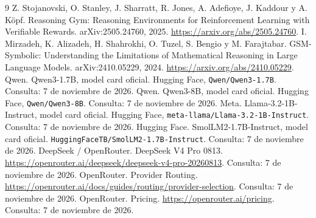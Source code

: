 \begingroup\raggedright
\begin{thebibliography}{9}
 Z. Stojanovski, O. Stanley, J. Sharratt, R. Jones,
A. Adefioye, J. Kaddour y A. K\"opf. Reasoning Gym: Reasoning Environments
for Reinforcement Learning with Verifiable Rewards. arXiv:2505.24760, 2025.
\url{https://arxiv.org/abs/2505.24760}.
 I. Mirzadeh, K. Alizadeh, H. Shahrokhi, O. Tuzel,
S. Bengio y M. Farajtabar. GSM-Symbolic: Understanding the Limitations
of Mathematical Reasoning in Large Language Models. arXiv:2410.05229, 2024.
\url{https://arxiv.org/abs/2410.05229}.
 Qwen. Qwen3-1.7B, model card oficial. Hugging Face,
\texttt{Qwen/Qwen3-1.7B}. Consulta: 7 de noviembre de 2026.
 Qwen. Qwen3-8B, model card oficial. Hugging Face,
\texttt{Qwen/Qwen3-8B}. Consulta: 7 de noviembre de 2026.
 Meta. Llama-3.2-1B-Instruct, model card oficial. Hugging Face,
\texttt{meta-llama/Llama-3.2-1B-Instruct}. Consulta: 7 de noviembre de 2026.
 Hugging Face. SmolLM2-1.7B-Instruct, model card oficial.
\texttt{HuggingFaceTB/SmolLM2-1.7B-Instruct}. Consulta: 7 de noviembre de 2026.
 DeepSeek / OpenRouter. DeepSeek V4 Pro 0813.
\url{https://openrouter.ai/deepseek/deepseek-v4-pro-20260813}.
Consulta: 7 de noviembre de 2026.
 OpenRouter. Provider Routing.
\url{https://openrouter.ai/docs/guides/routing/provider-selection}.
Consulta: 7 de noviembre de 2026.
 OpenRouter. Pricing.
\url{https://openrouter.ai/pricing}. Consulta: 7 de noviembre de 2026.
\end{thebibliography}
\endgroup
